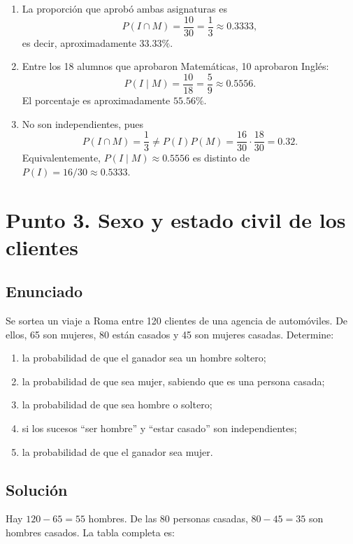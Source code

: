 \documentclass[12pt]{article}
\begin{document}
\begin{enumerate}
    \item La proporción que aprobó ambas asignaturas es
    \[
    P(I\cap M)=\frac{10}{30}=\frac{1}{3}\approx0.3333,
    \]
    es decir, aproximadamente $33.33\%$.
    \item Entre los 18 alumnos que aprobaron Matemáticas, 10 aprobaron Inglés:
    \[
    P(I\mid M)=\frac{10}{18}=\frac{5}{9}\approx0.5556.
    \]
    El porcentaje es aproximadamente $55.56\%$.
    \item No son independientes, pues
    \[
    P(I\cap M)=\frac{1}{3}\neq P(I)P(M)
    =\frac{16}{30}\cdot\frac{18}{30}=0.32.
    \]
    Equivalentemente, $P(I\mid M)\approx0.5556$ es distinto de $P(I)=16/30\approx0.5333$.
\end{enumerate}

\section*{Punto 3. Sexo y estado civil de los clientes}

\subsection*{Enunciado}

Se sortea un viaje a Roma entre 120 clientes de una agencia de automóviles. De ellos, 65 son mujeres, 80 están casados y 45 son mujeres casadas. Determine:

\begin{enumerate}
    \item la probabilidad de que el ganador sea un hombre soltero;
    \item la probabilidad de que sea mujer, sabiendo que es una persona casada;
    \item la probabilidad de que sea hombre o soltero;
    \item si los sucesos ``ser hombre'' y ``estar casado'' son independientes;
    \item la probabilidad de que el ganador sea mujer.
\end{enumerate}

\subsection*{Solución}

Hay $120-65=55$ hombres. De las 80 personas casadas, $80-45=35$ son hombres casados. La tabla completa es:
\end{document}
